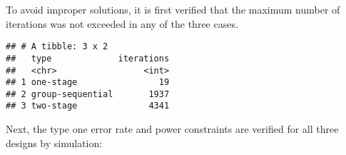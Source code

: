 \documentclass[
]{book}
\newenvironment{Shaded}{\begin{snugshade}}{\end{snugshade}}
\newcommand{\AttributeTok}[1]{\textcolor[rgb]{0.77,0.63,0.00}{#1}}
\newcommand{\FunctionTok}[1]{\textcolor[rgb]{0.00,0.00,0.00}{#1}}
\newcommand{\NormalTok}[1]{#1}
\newcommand{\SpecialCharTok}[1]{\textcolor[rgb]{0.00,0.00,0.00}{#1}}
\begin{document}
To avoid improper solutions, it is first verified that the maximum number of iterations was not exceeded in any of the three cases.

\begin{Shaded}
\end{Shaded}

\begin{verbatim}
## # A tibble: 3 x 2
##   type             iterations
##   <chr>                 <int>
## 1 one-stage                19
## 2 group-sequential       1937
## 3 two-stage              4341
\end{verbatim}

Next, the type one error rate and power constraints are verified for all three designs by simulation:
\end{document}
